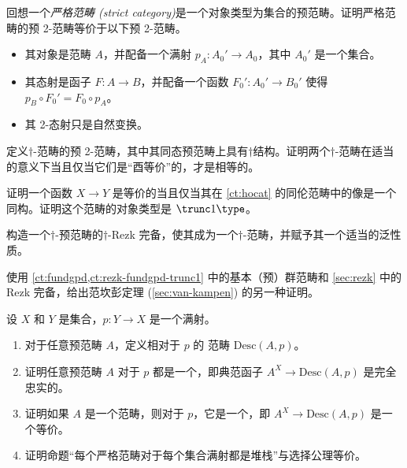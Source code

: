 \begin{ex}\label{ex:2strict-cat}
%
回想一个\emph{严格范畴 (strict category)}是一个对象类型为集合的预范畴。证明严格范畴的预 2-范畴等价于以下预 2-范畴。
\begin{itemize}
  \item 其对象是范畴 $A$，并配备一个满射
  $p_A:A_0'\to A_0$，其中 $A_0'$ 是一个集合。
  \item 其态射是函子 $F:A\to B$，并配备一个函数 $F_0':A_0' \to B_0'$ 使得 $p_B \circ F_0' = F_0 \circ p_A$。
  \item 其 2-态射只是自然变换。
\end{itemize}
\end{ex}

\begin{ex}\label{ex:pre2dagger-cat}
定义$\dagger$-范畴的预 2-范畴，其中其同态预范畴上具有$\dagger$结构。证明两个$\dagger$-范畴在适当的意义下当且仅当它们是“酉等价”的，才是相等的。
\end{ex}

\begin{ex}\label{ct:ex:hocat}
证明一个函数 $X\to Y$ 是等价的当且仅当其在 \cref{ct:hocat} 的同伦范畴中的像是一个同构。证明这个范畴的对象类型是 $\trunc1\type$。
\end{ex}

\begin{ex}\label{ex:dagger-rezk}
构造一个$\dagger$-预范畴的$\dagger$-Rezk 完备，使其成为一个$\dagger$-范畴，并赋予其一个适当的泛性质。
\end{ex}

\begin{ex}\label{ex:rezk-vankampen}
%
%
%
%
使用 \cref{ct:fundgpd,ct:rezk-fundgpd-trunc1} 中的基本（预）群范畴和 \cref{sec:rezk} 中的 Rezk 完备，给出范坎彭定理 (\cref{sec:van-kampen}) 的另一种证明。
\end{ex}

\begin{ex}\label{ex:stack}
设 $X$ 和 $Y$ 是集合，$p:Y\to X$ 是一个满射。
\begin{enumerate}
  \item 对于任意预范畴 $A$，定义相对于 $p$ 的  范畴 $\mathrm{Desc}(A,p)$。
  \item 证明任意预范畴 $A$ 对于 $p$ 都是一个，即典范函子 $A^X \to \mathrm{Desc}(A,p)$ 是完全忠实的。
  \item 证明如果 $A$ 是一个范畴，则对于 $p$，它是一个，即 $A^X \to \mathrm{Desc}(A,p)$ 是一个等价。
  \item 证明命题“每个严格范畴对于每个集合满射都是堆栈”与选择公理等价。
\end{enumerate}
\end{ex}


